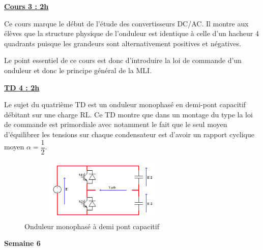 \documentclass[12pt]{article}
\begin{document}
\begin{adjustwidth}{5em}{0pt}
\color{blue}
\hspace{20pt}\textbf{\underline{Cours 3 : 2h}}\par
\vspace{10pt}
\color{black}

Ce cours marque le début de l'étude des convertisseurs DC/AC. Il montre aux élèves que la structure physique de l'onduleur est identique à celle d'un hacheur 4 quadrants puisque les grandeurs sont alternativement positives et négatives.\par 
Le point essentiel de ce cours est donc d'introduire la loi de commande d'un onduleur et donc le principe général de la MLI.


\color{blue}
\hspace{20pt}\textbf{\underline{TD 4 : 2h}}\par
\vspace{10pt}
\color{black}

Le sujet du quatrième TD est un onduleur monophasé en demi-pont capacitif débitant sur une charge RL. Ce TD montre que dans un montage du type la loi de commande est primordiale avec notamment le fait que le seul moyen d'équilibrer les tensions sur chaque condensateur est d'avoir un rapport cyclique moyen $\alpha = \dfrac{1}{2}$.

\begin{figure}[!h]
\centering
\includegraphics[width=8cm,height=3cm,trim=0cm 0cm 0cm 0cm, clip=true]{Images_Rapport/mipont}
\caption{Onduleur monophasé à demi pont capacitif}
\end{figure}


\end{adjustwidth}




\vspace{10pt}

\color{red}
\textbf{Semaine 6}
\end{document}
